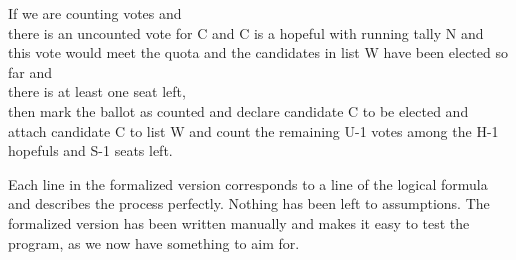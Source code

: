 \begin{texto2} 
If we are counting votes and \\
there is an uncounted vote for C and C is a hopeful with running tally N and \\
this vote would meet the quota and the candidates in list W have been elected so far and\\
there is at least one seat left, \\
then mark the ballot as counted and declare candidate C to be elected and\\
attach candidate C to list W and count the remaining U-1 votes among the H-1 hopefuls and S-1 seats left.
\end{texto2}

Each line in the formalized version corresponds to a line of the logical formula and describes the process perfectly. Nothing has been left to assumptions. The formalized version has been written manually and makes it easy to test the program, as we now have something to aim for.